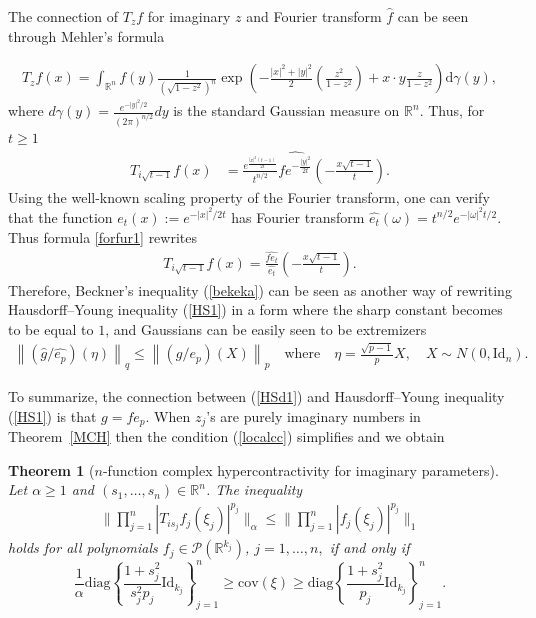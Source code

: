 \documentclass[9pt, a4paper]{amsart}
\newcommand{\1}{{\chi_{}}}%
\newtheorem{theorem}{Theorem}
\numberwithin{equation}{section}
\begin{document}
The connection of $T_{z}f$ for imaginary $z$ and Fourier transform $\widehat{f}$ can be seen through Mehler's formula

\begin{align*}
    T_{z}f(x) = \int_{\mathbb{R}^{n}}f(y) \frac{1}{(\sqrt{1-z^{2}})^{n}}\exp\left(-\frac{|x|^{2}+|y|^{2}}{2} \left(\frac{z^{2}}{1-z^{2}}\right)+x\cdot y \frac{z}{1-z^{2}}\right) \mathrm{d}\gamma(y),
\end{align*}
where $d\gamma(y) = \frac{e^{-|y|^{2}/2}}{(2\pi)^{n/2}}dy$ is the standard Gaussian measure on $\mathbb{R}^{n}$. Thus, for $t\geq 1$
		\begin{align}\label{forfur1}
			T_{i\sqrt{t-1}}f(x) &=\frac{e^{\frac{|x|^{2}(t-1)}{2t}}}{ t^{n/2}}\widehat{fe^{-\frac{|y|^{2}}{2t}}}\left(-\frac{x\sqrt{t-1}}{t}\right).
		\end{align}
        Using the well-known scaling property of the Fourier transform, one can verify that the function $e_{t}(x) := e^{-|x|^{2}/2t}$ has Fourier transform $  \widehat{e_{t}}(\omega) = t^{n/2}e^{-|\omega|^{2}t/2}$. Thus formula \eqref{forfur1} rewrites
		\begin{align}\label{forfur}
			T_{i\sqrt{t-1}}f(x)= \frac{\widehat{fe_{t}}}{\widehat{e_{t}}}\left( -\frac{x\sqrt{t-1}}{t}\right).
	\end{align}
Therefore, Beckner's inequality (\ref{bekeka}) can be seen as another way of rewriting Hausdorff--Young inequality (\ref{HS1}) in a form where the sharp constant becomes to be equal to $1$, and Gaussians can be easily seen to be extremizers 
\begin{align}\label{HSd1}
	\left\|(\widehat{g}/ \widehat{e_{p}})(\eta)\right\|_{q} \leq \left\| (g/ e_{p})(X)\right\|_{p} \quad \text{where} \quad \eta= \frac{\sqrt{p-1}}{p}X, \quad X \sim N\left(0, \mathrm{Id}_{n}\right).
\end{align}

To summarize, the connection between (\ref{HSd1}) and Hausdorff--Young inequality (\ref{HS1}) is that $g=fe_{p}$. When $z_{j}$'s are purely imaginary numbers in Theorem~\ref{MCH} then the condition (\ref{localcc}) simplifies and we obtain 

\begin{theorem}[$n$-function complex hypercontractivity for imaginary parameters]\label{MBEK}
    Let $\alpha\geq 1$ and $(s_{1}, \ldots, s_{n}) \in \mathbb{R}^{n}$. The inequality 
    \begin{align}\label{nfuComImagi}
        \| \prod_{j=1}^{n} |T_{is_{j}}f_{j}(\xi_{j})|^{p_{j}}\|_{\alpha}\leq \| \prod_{j=1}^{n} |f_{j}(\xi_{j})|^{p_{j}}\|_{1}
    \end{align}
    holds for all polynomials $f_{j} \in \mathcal{P}(\mathbb{R}^{k_{j}})$, $j=1, \ldots, n,$ if and only if 
\begin{equation}\label{MBEKloc}
\frac{1}{\alpha}\mathrm{diag}\left\{ \frac{1+s_{j}^{2}}{s_{j}^{2}p_{j}}\mathrm{Id}_{k_{j}} \right\}_{j=1}^{n} \geq \mathrm{cov}(\xi) \geq \mathrm{diag}\left\{ \frac{1+s_{j}^{2}}{p_{j}}\mathrm{Id}_{k_{j}} \right\}_{j=1}^{n}.
\end{equation}
\end{theorem}
\end{document}
